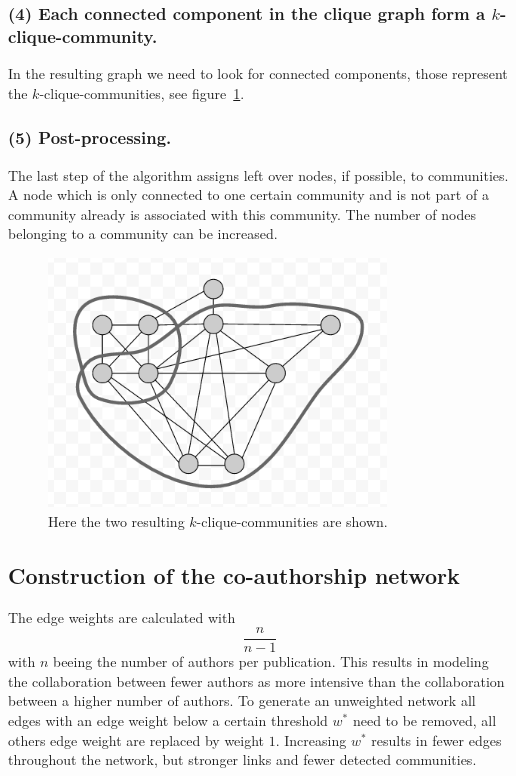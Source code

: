 \documentclass[runningheads,a4paper]{llncs}
\begin{document}
\subsubsection{(4) Each connected component in the clique graph form a $k$-clique-community.}
In the resulting graph we need to look for connected components, those represent the $k$-clique-communities, see figure~\ref{fig:result}.

\subsubsection{(5) Post-processing.}
The last step of the algorithm assigns left over nodes, if possible, to communities. A node which is only connected to one certain community and is not part of a community already is associated with this community. The number of nodes belonging to a community can be increased.

\begin{figure}
\begin{center}
	\includegraphics[width=0.8\textwidth]{result}
		\caption{Here the two resulting $k$-clique-communities are shown.}
		\label{fig:result}
\end{center}
\end{figure}


\subsection{Construction of the co-authorship network}
\label{cpm-construction}
The edge weights are calculated with $$\frac{n}{n-1}$$ with $n$ beeing the number of authors per publication.
This results in modeling the collaboration between fewer authors as more intensive than the collaboration between a higher number of authors.  
To generate an unweighted network all edges with an edge weight below a certain threshold $w^*$ need to be removed, all others edge weight are replaced by weight $1$. Increasing $w^*$ results in fewer edges throughout the network, but stronger links and fewer detected communities.
\end{document}
